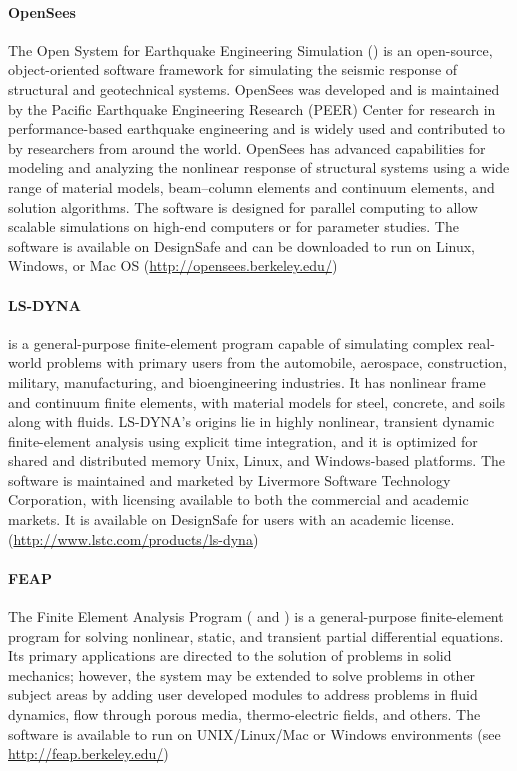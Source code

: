 \paragraph{OpenSees} The Open System for Earthquake Engineering Simulation () is an open-source, object-oriented software framework for simulating the seismic response of structural and geotechnical systems. OpenSees was developed and is maintained by the Pacific Earthquake Engineering Research (PEER) Center for research in performance-based earthquake engineering and is widely used and contributed to by researchers from around the world. OpenSees has advanced capabilities for modeling and analyzing the nonlinear response of structural systems using a wide range of material models, beam--column elements and continuum elements, and solution algorithms. The software is designed for parallel computing to allow scalable simulations on high-end computers or for parameter studies. The software is available on DesignSafe and can be downloaded to run on Linux, Windows, or Mac OS (\url{http://opensees.berkeley.edu/})

\paragraph{LS-DYNA}  is a general-purpose finite-element program capable of simulating complex real-world problems with primary users from the automobile, aerospace, construction, military, manufacturing, and bioengineering industries. It has nonlinear frame and continuum finite elements, with material models for steel, concrete, and soils along with fluids. LS-DYNA's origins lie in highly nonlinear, transient dynamic finite-element analysis using explicit time integration, and it is optimized for shared and distributed memory Unix, Linux, and Windows-based platforms. The software is maintained and marketed by Livermore Software Technology Corporation, with licensing available to both the commercial and academic markets. It is available on DesignSafe for users with an academic license. (\url{http://www.lstc.com/products/ls-dyna}) 

\paragraph{FEAP} The Finite Element Analysis Program ( and ) is a general-purpose finite-element program for solving nonlinear, static, and transient partial differential equations. Its primary applications are directed to the solution of problems in solid mechanics; however, the system may be extended to solve problems in other subject areas by adding user developed modules to address problems in fluid dynamics, flow through porous media, thermo-electric fields, and others. The software is available to run on UNIX/Linux/Mac or Windows environments (see \url{http://feap.berkeley.edu/})

